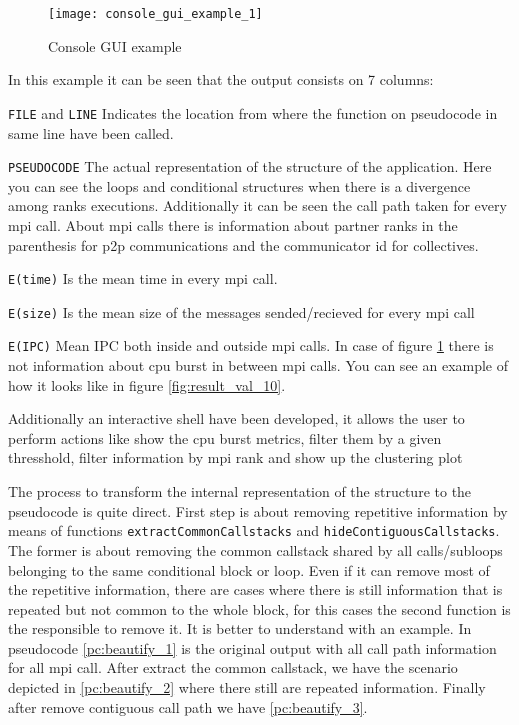 \begin{figure}[]
  \centering
  \texttt{[image: console\_gui\_example\_1]}
  \caption{Console GUI example}
  \label{fig:console_gui_example_1}
\end{figure}

In this example it can be seen that the output consists on 7 columns: 
\begin{description}
  \item \texttt{FILE} and \texttt{LINE} Indicates the location from where the
    function on pseudocode in same line have been called.
  \item \texttt{PSEUDOCODE} The actual representation of the structure of the
    application. Here you can see the loops and conditional structures when
    there is a divergence among ranks executions. Additionally it can be seen
    the call path taken for every mpi call. About mpi calls there is information
    about partner ranks in the parenthesis for p2p communications and the
    communicator id for collectives.
  \item \texttt{E(time)} Is the mean time in every mpi call.
  \item \texttt{E(size)} Is the mean size of the messages sended/recieved for
    every mpi call
  \item \texttt{E(IPC)} Mean IPC both inside and outside mpi calls. In case of
    figure \ref{fig:console_gui_example_1} there is not information about cpu
    burst in between mpi calls. You can see an example of how it looks like in
    figure \ref{fig:result_val_10}.
\end{description}

Additionally an interactive shell have been developed, it allows the user to perform
actions like show the cpu burst metrics, filter them by a given thresshold,
filter information by mpi rank and show up the clustering plot

The process to transform the internal representation of the structure to the
pseudocode is quite direct. First step is about removing repetitive information
by means of functions \texttt{extractCommonCallstacks} and
\texttt{hideContiguousCallstacks}. The former is about removing the common
callstack shared by all calls/subloops belonging to the same conditional block
or loop. Even if it can remove most of the repetitive information, there are
cases where there is still information that is repeated but not common to the
whole block, for this cases the second function is the responsible to remove it.
It is better to understand with an example. In pseudocode \ref{pc:beautify_1} is
the original output with all call path information for all mpi call. After
extract the common callstack, we have the scenario depicted in
\ref{pc:beautify_2} where there still are repeated information. Finally after
remove contiguous call path we have \ref{pc:beautify_3}.

